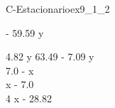 
\begin{bilevelmodel}{C-Estacionario}{ex9_1_2}
    \begin{upperlevel}{- 59.59 y}{
        
    }
    \end{upperlevel}
    \begin{lowerlevel}{4.82 y}{
         63.49 - 7.09 y  \\ 
 7.0 - x  \\ 
 x - 7.0  \\ 
 4 x - 28.82 
    }
    \end{lowerlevel}
\end{bilevelmodel}
    
        